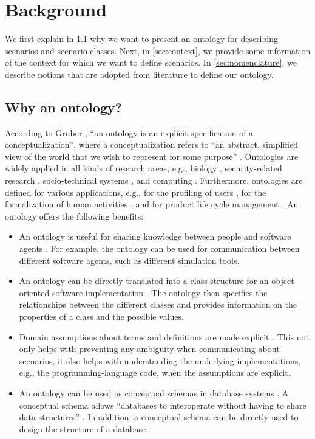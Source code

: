 \section{Background}
\label{sec:background}

We first explain in \cref{sec:why ontology} why we want to present an ontology for describing scenarios and scenario classes. Next, in \cref{sec:context}, we provide some information of the context for which we want to define scenarios. In \cref{sec:nomenclature}, we describe notions that are adopted from literature to define our ontology.



\subsection{Why an ontology?}
\label{sec:why ontology}
According to Gruber \cite{gruber1993ontology}, ``an ontology is an explicit specification of a conceptualization'', where a conceptualization refers to ``an abstract, simplified view of the world that we wish to represent for some purpose'' \cite{gruber1993ontology}. Ontologies are widely applied in all kinds of research areas, e.g., biology \cite{gkoutos2004mouse}, security-related research \cite{kim2005security}, socio-technical systems \cite{vanDamPhDThesis2009}, and computing \cite{chen2004soupa,chen2003ontology}. Furthermore, ontologies are defined for various applications, e.g., for the profiling of users \cite{golemati2007creating}, for the formalization of human activities \cite{lee2017location}, and for product life cycle management \cite{matsokis2010plm}. An ontology offers the following benefits:
\begin{itemize}
	\item An ontology is useful for sharing knowledge between people and software agents \cite{vanDamPhDThesis2009, noy2001ontology, musen1992dimensions}. For example, the ontology can be used for communication between different software agents, such as different simulation tools.
	\item An ontology can be directly translated into a class structure for an object-oriented software implementation \cite{vanDamPhDThesis2009}. The ontology then specifies the relationships between the different classes and provides information on the properties of a class and the possible values.
	\item Domain assumptions about terms and definitions are made explicit \cite{noy2001ontology}. This not only helps with preventing any ambiguity when communicating about scenarios, it also helps with understanding the underlying implementations, e.g., the programming-language code, when the assumptions are explicit.
	\item An ontology can be used as conceptual schemas in database systems  \cite{gruber1993ontology}. A conceptual schema allows ``databases to interoperate without having to share data structures'' \cite{gruber1993ontology}. In addition, a conceptual schema can be directly used to design the structure of a database.
\end{itemize}

